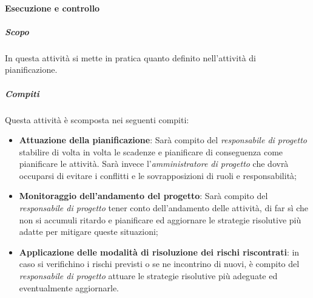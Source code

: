 \paragraph{Esecuzione e controllo}
\label{par:esecuzione_e_controllo}
\subparagraph{Scopo}
\label{par:esecuzione_e_controllo:scopo}
In questa attività si mette in pratica quanto definito nell'attività di pianificazione.
\subparagraph{Compiti}
\label{par:esecuzione_e_controllo:compiti}
Questa attività è scomposta nei seguenti compiti:
\begin{itemize}
    \item \textbf{Attuazione della pianificazione}: Sarà compito del \emph{responsabile di progetto} stabilire di volta in volta le scadenze e pianificare di conseguenza come pianificare le attività. Sarà invece l'\emph{amministratore di progetto} che dovrà occuparsi di evitare i conflitti e le sovrapposizioni di ruoli e responsabilità;
    \item \textbf{Monitoraggio dell'andamento del progetto}: Sarà compito del \emph{responsabile di progetto} tener conto dell'andamento delle attività, di far sì che non si accumuli ritardo e pianificare ed aggiornare le strategie risolutive più adatte per mitigare queste situazioni;
    \item \textbf{Applicazione delle modalità di risoluzione dei rischi riscontrati}: in caso si verifichino i rischi previsti o se ne incontrino di nuovi, è compito del \emph{responsabile di progetto} attuare le strategie risolutive più adeguate ed eventualmente aggiornarle.
\end{itemize}

